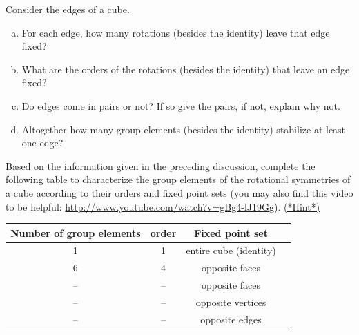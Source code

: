 \begin{exercise}\label{exercise:actions:Stabilizers1}
Consider the edges of a cube.
\begin{enumerate}[(a)]
\item
For each edge, how many rotations (besides the identity) leave that edge fixed?
\item
What are the orders of the rotations (besides the identity) that leave an edge fixed?
\item
Do edges come in pairs or not?  If so give the pairs, if not, explain why not.
\item
Altogether how many group elements (besides the identity) stabilize at least one edge?
\end{enumerate}
\end{exercise}
\begin{exercise}\label{exercise:actions:Stabilizers2}
Based on the information given in the preceding discussion, complete the following table to characterize the group elements of the rotational symmetries of a cube according to their orders and fixed point sets (you may also find this video to be helpful: \url{http://www.youtube.com/watch?v=gBg4-lJ19Gg}).
\hyperref[sec:actions:hints]{(*Hint*)}

\begin{tabular}{| c |c|c| r |}\hline
 \textbf{ Number of group elements} & \textbf{order} & \textbf{Fixed point set} \\ \hline
  1 & 1 & entire cube (identity) \\ \hline
  6 & 4 & opposite faces \\ \hline
 -- & -- & opposite faces \\ \hline
-- & -- & opposite vertices \\ \hline
-- & -- & opposite edges \\ \hline
\end{tabular}
\end{exercise}
